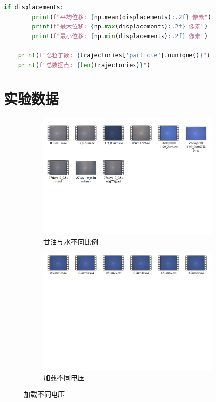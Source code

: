 \documentclass[a4paper]{report} %
\begin{document}
\begin{lstlisting}[language=Python, caption=可视化与计算, label=code:calculate]
    if displacements:
        print(f"平均位移: {np.mean(displacements):.2f} 像素")
        print(f"最大位移: {np.max(displacements):.2f} 像素")
        print(f"最小位移: {np.min(displacements):.2f} 像素")
    
    print(f"总粒子数: {trajectories['particle'].nunique()}")
    print(f"总数据点: {len(trajectories)}")
\end{lstlisting}

\section{实验数据}
\begin{figure}[H]
    \centering
    \begin{subfigure}{0.45\textwidth}
        \includegraphics[width=\linewidth]{不同比例.png}
        \caption{甘油与水不同比例}
    \end{subfigure}
    \begin{subfigure}{0.45\textwidth}
        \includegraphics[width=\linewidth]{不同电压.png}
        \caption{加载不同电压}
    \end{subfigure}


\end{figure}
\end{document}
